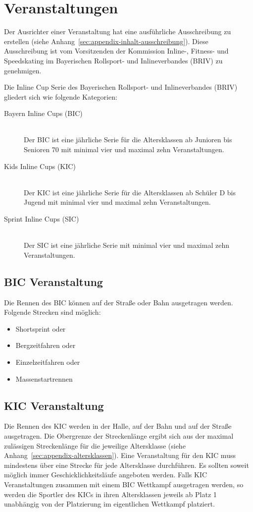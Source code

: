 \section{Veranstaltungen}
Der Ausrichter einer Veranstaltung hat eine ausführliche Ausschreibung zu erstellen (siehe Anhang~\ref{sec:appendix-inhalt-ausschreibung}). Diese Ausschreibung ist vom Vorsitzenden der Kommission Inline-, Fitness- und Speedskating im Bayerischen Rollsport- und Inlineverbandes (BRIV) zu genehmigen.

Die Inline Cup Serie des Bayerischen Rollsport- und Inlineverbandes (BRIV) gliedert sich wie folgende Kategorien:

\begin{description}
	\item[Bayern Inline Cups (BIC)] \hfill \\
	Der BIC ist eine jährliche Serie für die Altersklassen ab Junioren bis Senioren 70 mit minimal vier und maximal zehn Veranstaltungen.
	\item[Kids Inline Cups (KIC)] \hfill \\
	Der KIC ist eine jährliche Serie für die Altersklassen ab Schüler D bis Jugend mit minimal vier und maximal zehn Veranstaltungen.
	\item[Sprint Inline Cups (SIC)] \hfill \\
	Der SIC ist eine jährliche Serie mit minimal vier und maximal zehn Veranstaltungen.
\end{description}

\subsection{BIC Veranstaltung}
\label{subsec:bic-veranstaltung}
Die Rennen des BIC können auf der Straße oder Bahn ausgetragen werden. Folgende Strecken sind möglich:
\begin{itemize}
	\item Shortsprint oder
	\item Bergzeitfahren oder
	\item Einzelzeitfahren oder
	\item Massenstartrennen
\end{itemize}

\subsection{KIC Veranstaltung}
Die Rennen des KIC werden in der Halle, auf der Bahn und auf der Straße ausgetragen. Die Obergrenze der Streckenlänge ergibt sich aus der maximal zulässigen Streckenlänge für die jeweilige Altersklasse (siehe Anhang~\ref{sec:appendix-altersklassen}). Eine Veranstaltung für den KIC muss mindestens über eine Strecke für jede Altersklasse durchführen. Es sollten soweit möglich immer Geschicklichkeitsläufe angeboten werden. Falls KIC Veranstaltungen zusammen mit einem BIC Wettkampf ausgetragen werden, so werden die Sportler des KICs in ihren Altersklassen jeweils ab Platz 1 unabhängig von der Platzierung im eigentlichen Wettkampf platziert.


